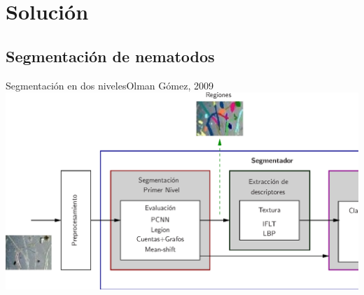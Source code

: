 \documentclass[15pt]{beamer} %
\begin{document}
\section{Solución}

\subsection{Segmentación de nematodos}


\begin{frame}{Segmentación en dos niveles}{{\tiny{Olman Gómez, 2009}}}
  \includegraphics[width=\textwidth]{gomezsegm_fixed}
\end{frame}
\end{document}

